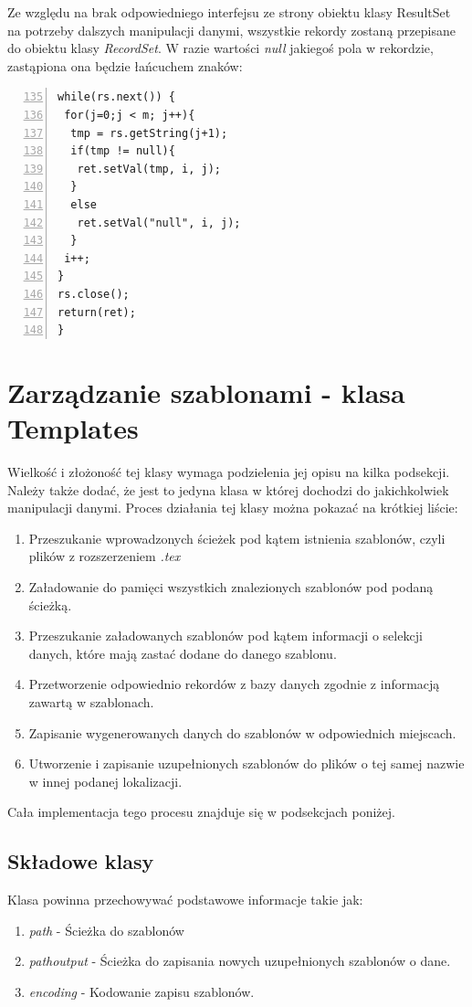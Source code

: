 Ze względu na brak odpowiedniego interfejsu ze strony obiektu klasy ResultSet na potrzeby dalszych manipulacji danymi, wszystkie rekordy zostaną przepisane do obiektu klasy \emph{RecordSet}. W razie wartości  \emph{null} jakiegoś pola w rekordzie, zastąpiona ona będzie łańcuchem znaków:
\begin{lstlisting}[numbers=left,firstnumber=135]
while(rs.next()) {
 for(j=0;j < m; j++){
  tmp = rs.getString(j+1);
  if(tmp != null){
   ret.setVal(tmp, i, j);
  }
  else
   ret.setVal("null", i, j);
  }
 i++;
}   
rs.close();
return(ret);
}
\end{lstlisting}


\section{Zarządzanie szablonami - klasa Templates}

Wielkość i złożoność tej klasy wymaga podzielenia jej opisu na kilka podsekcji. Należy także dodać, że jest to jedyna klasa w której dochodzi do jakichkolwiek manipulacji danymi. Proces działania tej klasy można pokazać na krótkiej liście:
\vspace{5mm}
    \begin{enumerate}
    \item Przeszukanie wprowadzonych ścieżek pod kątem istnienia szablonów, czyli plików z rozszerzeniem \emph{.tex}
    \item Załadowanie do pamięci wszystkich znalezionych szablonów pod podaną ścieżką.
    \item Przeszukanie załadowanych szablonów pod kątem informacji o selekcji danych, które mają zastać dodane do danego szablonu.
    \item Przetworzenie odpowiednio rekordów z bazy danych zgodnie z informacją zawartą w szablonach.
    \item Zapisanie wygenerowanych danych do szablonów w odpowiednich miejscach.
    \item Utworzenie i zapisanie uzupełnionych szablonów do plików o tej samej nazwie w innej podanej lokalizacji.
     \end{enumerate}
\vspace{5mm}
Cała implementacja tego procesu znajduje się w podsekcjach poniżej. 
\subsection{Składowe klasy}

Klasa powinna przechowywać podstawowe informacje takie jak:
    \begin{enumerate}
    \item \emph{path} - Ścieżka do szablonów
    \item \emph{pathoutput}  - Ścieżka do zapisania nowych uzupełnionych szablonów o dane.
    \item \emph{encoding} - Kodowanie zapisu szablonów.
     \end{enumerate}

